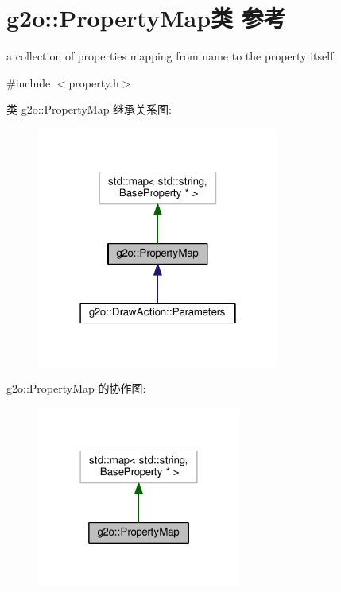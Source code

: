 \hypertarget{classg2o_1_1PropertyMap}{\section{g2o\-:\-:Property\-Map类 参考}
\label{classg2o_1_1PropertyMap}
}


a collection of properties mapping from name to the property itself  




{\ttfamily \#include $<$property.\-h$>$}



类 g2o\-:\-:Property\-Map 继承关系图\-:
\nopagebreak
\begin{figure}[H]
\begin{center}
\leavevmode
\includegraphics[width=226pt]{classg2o_1_1PropertyMap__inherit__graph}
\end{center}
\end{figure}


g2o\-:\-:Property\-Map 的协作图\-:
\nopagebreak
\begin{figure}[H]
\begin{center}
\leavevmode
\includegraphics[width=190pt]{classg2o_1_1PropertyMap__coll__graph}
\end{center}
\end{figure}
